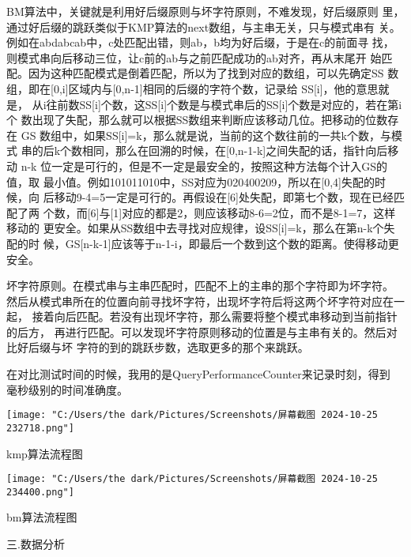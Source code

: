 \documentclass[12pt]{article}
\begin{document}
BM算法中，关键就是利用好后缀原则与坏字符原则，不难发现，好后缀原则
里，通过好后缀的跳跃类似于KMP算法的next数组，与主串无关，只与模式串有
关。例如在abdabcab中，c处匹配出错，则ab，b均为好后缀，于是在c的前面寻
找，则模式串向后移动三位，让c前的ab与之前匹配成功的ab对齐，再从末尾开
始匹配。因为这种匹配模式是倒着匹配，所以为了找到对应的数组，可以先确定SS
数组，即在[0,i]区域内与[0,n-1]相同的后缀的字符个数，记录给 SS[i]，他的意思就是，
从i往前数SS[i]个数，这SS[i]个数是与模式串后的SS[i]个数是对应的，若在第i个
数出现了失配，那么就可以根据SS数组来判断应该移动几位。把移动的位数存在
GS 数组中，如果SS[i]=k，那么就是说，当前的这个数往前的一共k个数，与模式
串的后k个数相同，那么在回溯的时候，在[0,n-1-k]之间失配的话，指针向后移动
n-k 位一定是可行的，但是不一定是最安全的，按照这种方法每个计入GS的值，取
最小值。例如101011010中，SS对应为{020400209}，所以在[0,4]失配的时候，向
后移动9-4=5一定是可行的。再假设在[6]处失配，即第七个数，现在已经匹配了两
个数，而[6]与[1]对应的都是2，则应该移动8-6=2位，而不是8-1=7，这样移动的
更安全。如果从SS数组中去寻找对应规律，设SS[i]=k，那么在第n-k个失配的时
候，GS[n-k-1]应该等于n-1-i，即最后一个数到这个数的距离。使得移动更安全。 

坏字符原则。在模式串与主串匹配时，匹配不上的主串的那个字符即为坏字符。
然后从模式串所在的位置向前寻找坏字符，出现坏字符后将这两个坏字符对应在一起，
接着向后匹配。若没有出现坏字符，那么需要将整个模式串移动到当前指针的后方，
再进行匹配。可以发现坏字符原则移动的位置是与主串有关的。然后对比好后缀与坏
字符的到的跳跃步数，选取更多的那个来跳跃。 

在对比测试时间的时候，我用的是QueryPerformanceCounter来记录时刻，得到
毫秒级别的时间准确度。


	


	\texttt{[image: "C:/Users/the dark/Pictures/Screenshots/屏幕截图 2024-10-25 232718.png"]}
\begin{center}{   kmp算法流程图}
\end{center}

	


	\texttt{[image: "C:/Users/the dark/Pictures/Screenshots/屏幕截图 2024-10-25 234400.png"]}
\begin{center}{   bm算法流程图}
\end{center}
	


\begin{large}
	\noindent
	\heiti
	三.数据分析
\end{large}
\end{document}
